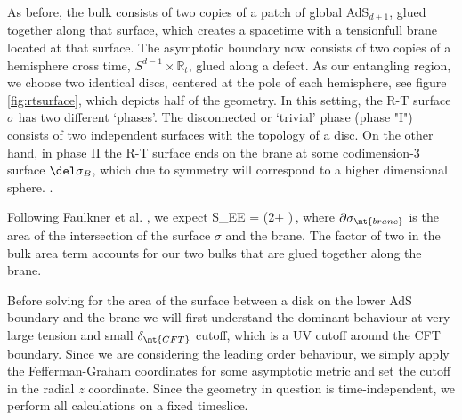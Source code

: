 As before, the bulk consists of two copies of a patch of global AdS$_{d+1}$, glued together along that surface, which creates a spacetime with a tensionfull brane located at that surface. The asymptotic boundary now consists of two copies of a hemisphere cross time, $S^{d-1}\times \mathbb R_t$, glued along a defect. As our entangling region, we choose two identical discs, centered at the pole of each hemisphere, see figure \ref{fig:rtsurface}, which depicts half of the geometry. In this setting, the R-T surface $\sigma$ has two different `phases'. The disconnected or `trivial' phase (phase "I") consists of two independent surfaces with the topology of a disc. On the other hand, in phase II the R-T surface ends on the brane at some codimension-$3$ surface $\del \sigma_B$, which due to symmetry will correspond to a higher dimensional sphere. .



\begin{figure}[h]
	\def\svgwidth{0.6\linewidth}
\end{figure}




Following Faulkner et al. \cite{Faulkner:2013ana}, we expect 
\beq\label{gen}
S_{EE} = \Big(2+ \Big)\,,
\eeq where $\partial \sigma_\mt{brane}$ is the area of the intersection of the surface $\sigma$ and the brane. The factor of two in the bulk area term accounts for our two bulks that are glued together along the brane.


Before solving for the area of the surface between a disk on the lower AdS boundary and the brane we will first understand the dominant behaviour at very large tension and small $\delta_\mt{CFT}$ cutoff, which is a UV cutoff around the CFT boundary. Since we are considering the leading order behaviour, we simply apply the Fefferman-Graham coordinates for some asymptotic metric and set the cutoff in the radial $z$ coordinate. Since the geometry in question is time-independent, we perform all calculations on a fixed timeslice.

